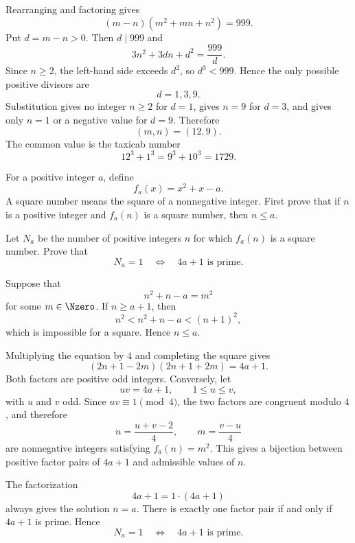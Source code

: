     \begin{solution}
        Rearranging and factoring gives
        \[
            (m-n)(m^2+mn+n^2)=999.
        \]
        Put $d=m-n>0$. Then $d\mid999$ and
        \[
            3n^2+3dn+d^2=\frac{999}{d}.
        \]
        Since $n\geq2$, the left-hand side exceeds $d^2$, so $d^3<999$.
        Hence the only possible positive divisors are
        \[
            d=1,3,9.
        \]
        Substitution gives no integer $n\geq2$ for $d=1$, gives $n=9$ for
        $d=3$, and gives only $n=1$ or a negative value for $d=9$. Therefore
        \[
            \boxed{(m,n)=(12,9)}.
        \]
        The common value is the taxicab number
        \[
            12^3+1^3=9^3+10^3=1729.
        \]
    \end{solution}

    \begin{expectedproblem}
        For a positive integer $a$, define
        \[
            f_a(x)=x^2+x-a.
        \]
        A square number means the square of a nonnegative integer. First prove
        that if $n$ is a positive integer and $f_a(n)$ is a square number, then
        $n\leq a$.

        Let $N_a$ be the number of positive integers $n$ for which $f_a(n)$ is
        a square number. Prove that
        \[
            N_a=1
            \quad\Longleftrightarrow\quad
            4a+1\text{ is prime}.
        \]
    \end{expectedproblem}

    \begin{solution}
        Suppose that
        \[
            n^2+n-a=m^2
        \]
        for some $m\in\Nzero$. If $n\geq a+1$, then
        \[
            n^2<n^2+n-a<(n+1)^2,
        \]
        which is impossible for a square. Hence $n\leq a$.

        Multiplying the equation by $4$ and completing the square gives
        \[
            (2n+1-2m)(2n+1+2m)=4a+1.
        \]
        Both factors are positive odd integers. Conversely, let
        \[
            uv=4a+1,
            \qquad
            1\leq u\leq v,
        \]
        with $u$ and $v$ odd. Since $uv\equiv1\pmod4$, the two factors are
        congruent modulo $4$, and therefore
        \[
            n=\frac{u+v-2}{4},
            \qquad
            m=\frac{v-u}{4}
        \]
        are nonnegative integers satisfying $f_a(n)=m^2$. This gives a
        bijection between positive factor pairs of $4a+1$ and admissible values
        of $n$.

        The factorization
        \[
            4a+1=1\cdot(4a+1)
        \]
        always gives the solution $n=a$. There is exactly one factor pair if
        and only if $4a+1$ is prime. Hence
        \[
            \boxed{
                N_a=1
                \quad\Longleftrightarrow\quad
                4a+1\text{ is prime}
            }.
        \]
    \end{solution}


